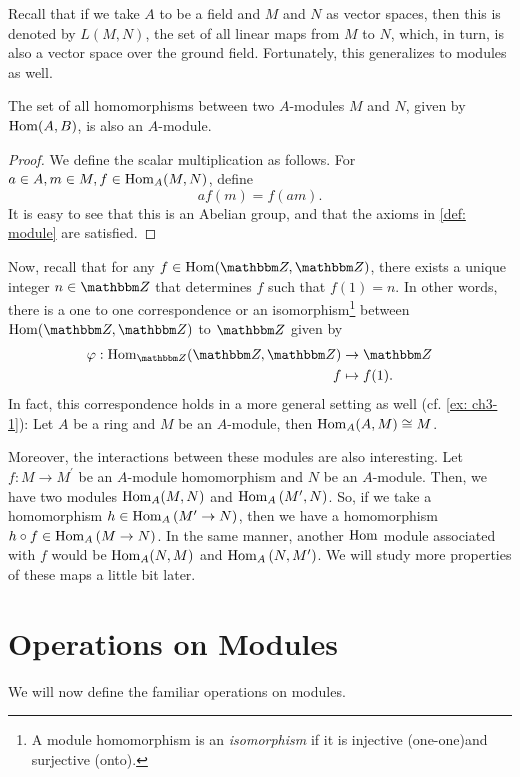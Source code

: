 Recall that if we take $A$ to be a field and $M$ and $N$ as vector spaces, then this is denoted by $L(M, N)$, the set of all linear maps from $M$ to $N$, which, in turn, is also a vector space over the ground field. Fortunately, this generalizes to modules as well.
\begin{proposition}
    The set of all homomorphisms between two $A$-modules $M$ and $N$, given by ${\operatorname{\text{Hom\/}}}(A,B)$, is also an $A$-module.
\end{proposition}
\begin{proof}
    We define the scalar multiplication as follows. For $a \in A, m \in M, f\in {\operatorname{\text{Hom\/}}}_{A}(M, N)$, define 
    \[af(m) = f(am).\]
    It is easy to see that this is an Abelian group, and that the axioms in \cref{def: module} are satisfied.
\end{proof}

Now, recall that for any $f \in {\Hom}(\Z, \Z)$, there exists a unique integer $n \in \Z$ that determines $f$ such that $f(1) = n$. In other words, there is a one to one correspondence or an isomorphism\footnote{A module homomorphism is an {\it isomorphism} if it is injective (one-one)and surjective (onto).} between ${\Hom}(\Z, \Z)$ to $\Z$ given by
$$
\begin{aligned}
\varphi: {\Hom}_{\Z}(\Z, \Z) & \rightarrow \Z \\
f & \mapsto f(1).
\end{aligned}
$$
In fact, this correspondence holds in a more general setting as well (cf. \cref{ex: ch3-1}):
Let $A$ be a ring and $M$ be an $A$-module, then ${\operatorname{\text{Hom\/}}}_{A}(A, M) \cong M$.

Moreover, the interactions between these modules are also interesting. Let $f: M \rightarrow M^{\prime}$ be an $A$-module homomorphism and $N$ be an $A$-module. Then, we have two modules ${\operatorname{\text{Hom\/}}}_{A}(M, N)$ and ${\operatorname{\text{Hom\/}}}_{A}\left(M^{\prime}, N\right)$.
So, if we take a homomorphism $h \in {\operatorname{\text{Hom\/}}}_{A}\left(M' \rightarrow N\right)$, then we have a homomorphism $h \circ f \in {\operatorname{\text{Hom\/}}}_{A}\left(M \rightarrow N\right)$. In the same manner, another ${\operatorname{\text{Hom\/}}}$ module associated with $f$ would be ${\operatorname{\text{Hom\/}}}_{A}(N, M)$ and ${\operatorname{\text{Hom\/}}}_{A}\left(N, M^{\prime}\right)$. We will study more properties of these maps a little bit later.  


\section{Operations on Modules}\label{sec: op-modules}
We will now define the familiar operations on modules.
